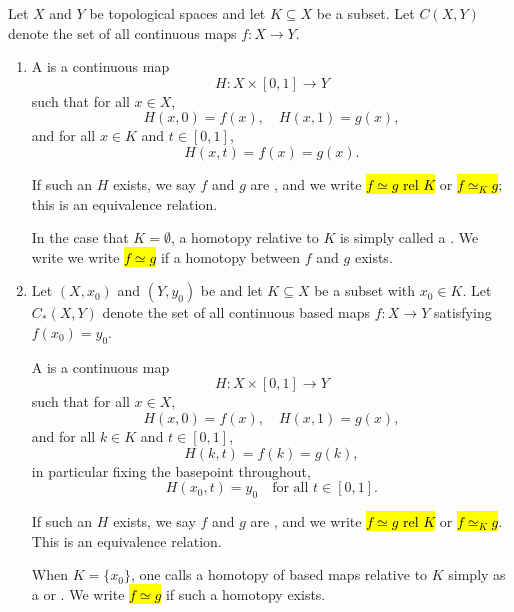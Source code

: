 \begin{definition} \label{definition:homotopy_of_maps_of_topological_spaces_relative_to_a_subset}

    Let $X$ and $Y$ be topological spaces and let $K \subseteq X$ be a subset. Let $C(X,Y)$ denote the set of all continuous maps $f : X \to Y$.  

    \begin{enumerate}
        \item A  is a continuous map
        $$H : X \times [0,1] \to Y$$
        such that for all $x \in X$,
        $$H(x,0) = f(x), \quad H(x,1) = g(x),$$
        and for all $x \in K$ and $t \in [0,1]$,
        $$H(x,t) = f(x) = g(x).$$

        If such an $H$ exists, we say $f$ and $g$ are , and we write \hl{$f \simeq g \text{ rel } K$} or \hl{$f \simeq_K g$}; this is an equivalence relation.

        In the case that $K = \emptyset$, a homotopy relative to $K$ is simply called a . We write we write \hl{$f \simeq g$} if a homotopy between $f$ and $g$ exists.

        \item Let $(X, x_0)$ and $(Y, y_0)$ be  and let $K \subseteq X$ be a subset with $x_0 \in K$. Let $C_*(X,Y)$ denote the set of all continuous based maps $f : X \to Y$ satisfying $f(x_0) = y_0$.

        A  is a continuous map
        $$H : X \times [0,1] \to Y$$
        such that for all $x \in X$,
        $$H(x,0) = f(x), \quad H(x,1) = g(x),$$
        and for all $k \in K$ and $t \in [0,1]$,
        $$H(k,t) = f(k) = g(k),$$
        in particular fixing the basepoint throughout,
        $$H(x_0, t) = y_0 \quad \text{for all } t \in [0,1].$$

        If such an $H$ exists, we say $f$ and $g$ are , and we write \hl{$f \simeq g \text{ rel } K$} or \hl{$f \simeq_K g$}. This is an equivalence relation.

        When $K = \{x_0\}$, one calls a homotopy of based maps relative to $K$ simply as a  or . We write \hl{$f \simeq g$} if such a homotopy exists.
    \end{enumerate}
\end{definition}